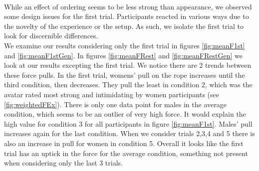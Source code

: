 \\
 While an effect of ordering seems to be less strong than appearance, we observed some design issues for the first trial. Participants reacted in various ways due to the novelty of the experience or the setup. As such, we isolate the first trial to look for discernible differences.
 \\
 We examine our results considering only the first trial in figures  \ref{fig:meanF1st} and \ref{fig:meanF1stGen}. In figures \ref{fig:meanFRest} and \ref{fig:meanFRestGen} we look at our results excepting the first trial.  We notice there are 2 trends between these force pulls. In the first trial, womens' pull on the rope increases until the third condition, then decreases. They pull the least in condition 2, which was the avatar rated most strong and intimidating by women participants (see \ref{fig:weightedFEx}). There is only one data point for males in the average condition, which seems to be an outlier of very high force. It would explain the high value for condition 3 for all participants in figure \ref{fig:meanF1st}. Males' pull increases again for the last condition. When we consider trials 2,3,4 and 5 there is also an increase in pull for women in condition 5. Overall it looks like the first trial has an uptick in the force for the average condition, something not present when considering only the last 3 trials.\\


